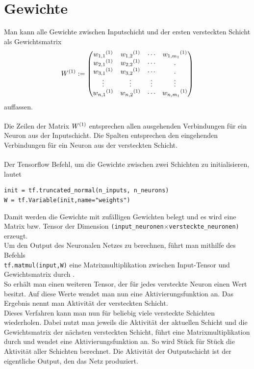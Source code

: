 \section{Gewichte}
Man kann alle Gewichte zwischen Inputschicht und der ersten versteckten Schicht als Gewichtsmatrix \begin{equation}
W\textsuperscript{(1)}:=
\begin{pmatrix}
w_{1,1}\textsuperscript{(1)} & w_{1,2}\textsuperscript{(1)} & \cdots & w_{1,m_1}\textsuperscript{(1)} \\
w_{2,1}\textsuperscript{(1)} & w_{2,2}\textsuperscript{(1)}& \cdots & .\\
w_{3,1}\textsuperscript{(1)} & w_{3,2}\textsuperscript{(1)}& \cdots & .\\
\vdots & \vdots & \vdots & \vdots \\
w_{n,1}\textsuperscript{(1)} & w_{n,2}\textsuperscript{(1)} & \cdots & w_{n,m_1}\textsuperscript{(1)}\\
\end{pmatrix} \end{equation}
auffassen.\\\\
Die Zeilen der Matrix $W\textsuperscript{(1)}$ entsprechen allen ausgehenden Verbindungen f\"ur ein Neuron aus der Inputschicht. Die Spalten entsprechen den eingehenden Verbindungen f\"ur ein Neuron aus der versteckten Schicht. \\\\
Der Tensorflow Befehl, um die Gewichte zwischen zwei Schichten zu initialisieren, lautet \cite{handson}

\vspace{0.3cm}
\begin{lstlisting}
init = tf.truncated_normal(n_inputs, n_neurons)
W = tf.Variable(init,name="weights")
\end{lstlisting}

Damit werden die Gewichte mit zuf\"alligen Gewichten belegt und es wird eine Matrix bzw. Tensor der Dimension \lstinline$(input_neuronen$$ \times $\lstinline$versteckte_neuronen)$ erzeugt.\\
Um den Output des Neuronalen Netzes zu berechnen, f\"uhrt man mithilfe des Befehls\\ \lstinline$tf.matmul(input,W)$ eine Matrixmultiplikation zwischen Input-Tensor und Gewichtsmatrix durch \cite{handson}. \\
So erhält man einen weiteren Tensor, der f\"ur jedes versteckte Neuron einen Wert besitzt. Auf diese Werte wendet man nun eine Aktivierungsfunktion an. Das Ergebnis nennt man Aktivit\"at \cite{Ertel2013} der versteckten Schicht.\\
Dieses Verfahren kann man nun f\"ur beliebig viele versteckte Schichten wiederholen. Dabei nutzt man jeweils die Aktivit\"at der aktuellen Schicht und die Gewichtsmatrix der nächsten versteckten Schicht, führt eine Matrixmultiplikation durch und wendet eine Aktivierungsfunktion an. So wird Stück für Stück die Aktivit\"at aller Schichten berechnet. Die Aktivität der Outputschicht ist der eigentliche Output, den das Netz produziert.



